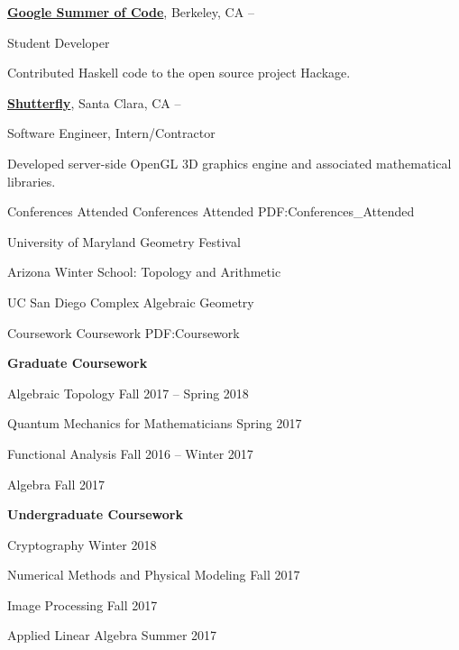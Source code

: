 \documentclass[letterpaper,MMMyyyy,nonstopmode]{simpleresumecv}
\begin{document}
\begin{Body}
\BigGap
\Entry
\href{https://summerofcode.withgoogle.com/archive/}
{\textbf{Google Summer of Code}},
Berkeley, CA
\hfill
{} --

\Gap
\BulletItem
Student Developer

\begin{Detail}
\SubBulletItem
Contributed Haskell code to the open source project Hackage.
\end{Detail}


\BigGap
\Entry
\href{http://www.shutterfly.com/}
{\textbf{Shutterfly}},
Santa Clara, CA
\hfill
{} --

\Gap
\BulletItem
Software Engineer, Intern/Contractor
\begin{Detail}
\SubBulletItem
Developed server-side OpenGL 3D graphics engine and associated mathematical libraries.
\end{Detail}

\Section
{Conferences Attended}
{Conferences Attended}
{PDF:Conferences_Attended}

\BulletItem
University of Maryland Geometry Festival
\hfill {}

\BulletItem
Arizona Winter School: Topology and Arithmetic
\hfill {}


\BulletItem
UC San Diego Complex Algebraic Geometry
\hfill {}

\Section
{Coursework}
{Coursework}
{PDF:Coursework}

\textbf{Graduate Coursework}

\BulletItem
Algebraic Topology
\hfill Fall 2017 -- Spring 2018

\BulletItem
Quantum Mechanics for Mathematicians
\hfill Spring 2017

\BulletItem
Functional Analysis
\hfill Fall 2016 -- Winter 2017

\BulletItem
Algebra
\hfill Fall 2017
\BigGap

\textbf{Undergraduate Coursework}

\BulletItem
Cryptography
\hfill Winter 2018

\BulletItem
Numerical Methods and Physical Modeling
\hfill Fall 2017

\BulletItem
Image Processing
\hfill Fall 2017

\BigGap
\BulletItem
Applied Linear Algebra
\hfill Summer 2017


\end{Body}
\end{document}
